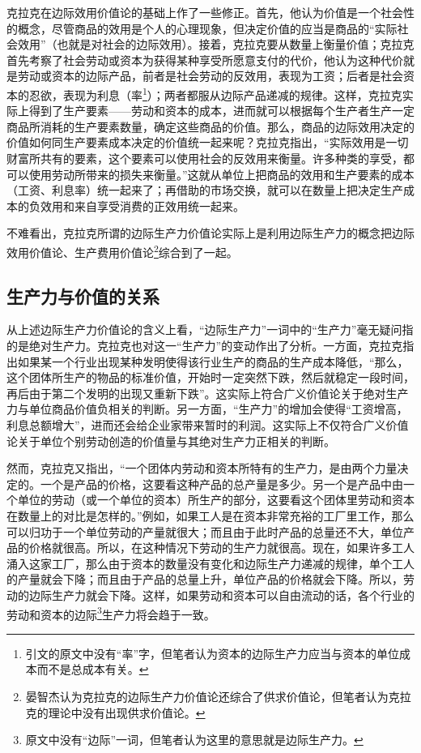 克拉克在边际效用价值论的基础上作了一些修正。首先，他认为价值是一个社会性的概念，尽管商品的效用是个人的心理现象，但决定价值的应当是商品的“实际社会效用”（也就是对社会的边际效用）。接着，克拉克要从数量上衡量价值；克拉克首先考察了社会劳动或资本为获得某种享受所愿意支付的代价，他认为这种代价就是劳动或资本的边际产品，前者是社会劳动的反效用，表现为工资；后者是社会资本的忍欲，表现为利息（率\footnote{引文的原文中没有“率”字，但笔者认为资本的边际生产力应当与资本的单位成本而不是总成本有关。}）；两者都服从边际产品递减的规律。\cite[309-316]{YanZhiJieCongBianJiGeMingDaoKaiEnSiGeMing2022}这样，克拉克实际上得到了生产要素——劳动和资本的成本，进而就可以根据每个生产者生产一定商品所消耗的生产要素数量，确定这些商品的价值\cite[311]{KeLaKeCaiFuDeFenPei1983}。那么，商品的边际效用决定的价值如何同生产要素成本决定的价值统一起来呢？克拉克指出，“实际效用是一切财富所共有的要素，这个要素可以使用社会的反效用来衡量。许多种类的享受，都可以使用劳动所带来的损失来衡量。”\cite[xv]{KeLaKeCaiFuDeFenPei1983}这就从单位上把商品的效用和生产要素的成本（工资、利息率）统一起来了；再借助的市场交换，就可以在数量上把决定生产成本的负效用和来自享受消费的正效用统一起来\cite[331-333]{KeLaKeCaiFuDeFenPei1983}。

不难看出，克拉克所谓的边际生产力价值论实际上是利用边际生产力的概念把边际效用价值论、生产费用价值论\footnote{晏智杰\cite[312]{YanZhiJieCongBianJiGeMingDaoKaiEnSiGeMing2022}认为克拉克的边际生产力价值论还综合了供求价值论，但笔者认为克拉克的理论中没有出现供求价值论。}综合到了一起。

\subsection{生产力与价值的关系}

从上述边际生产力价值论的含义上看，“边际生产力”一词中的“生产力”毫无疑问指的是绝对生产力。克拉克也对这一“生产力”的变动作出了分析。一方面，克拉克指出如果某一个行业出现某种发明使得该行业生产的商品的生产成本降低，“那么，这个团体所生产的物品的标准价值，开始时一定突然下跌，然后就稳定一段时间，再后由于第二个发明的出现又重新下跌”\cite[361]{KeLaKeCaiFuDeFenPei1983}。这实际上符合广义价值论关于绝对生产力与单位商品价值负相关的判断。另一方面，“生产力”的增加会使得“工资增高，利息总额增大”\cite[241]{KeLaKeCaiFuDeFenPei1983}，进而还会给企业家带来暂时的利润\cite[352]{KeLaKeCaiFuDeFenPei1983}。这实际上不仅符合广义价值论关于单位个别劳动创造的价值量与其绝对生产力正相关的判断。

然而，克拉克又指出，“一个团体内劳动和资本所特有的生产力，是由两个力量决定的。一个是产品的价格，这要看这种产品的总产量是多少。另一个是产品中由一个单位的劳动（或一个单位的资本）所生产的部分，这要看这个团体里劳动和资本在数量上的对比是怎样的。”\cite[252]{KeLaKeCaiFuDeFenPei1983}例如，如果工人是在资本非常充裕的工厂里工作，那么可以归功于一个单位劳动的产量就很大；而且由于此时产品的总量还不大，单位产品的价格就很高。所以，在这种情况下劳动的生产力就很高。现在，如果许多工人涌入这家工厂，那么由于资本的数量没有变化和边际生产力递减的规律，单个工人的产量就会下降；而且由于产品的总量上升，单位产品的价格就会下降。所以，劳动的边际生产力就会下降。这样，如果劳动和资本可以自由流动的话，各个行业的劳动和资本的边际\footnote{原文中没有“边际”一词，但笔者认为这里的意思就是边际生产力。}生产力将会趋于一致\cite[254]{KeLaKeCaiFuDeFenPei1983}。

